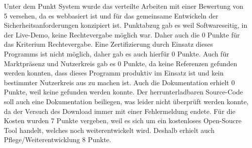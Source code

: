 Unter dem Punkt System wurde das verteilte Arbeiten mit einer Bewertung von  5 versehen, da es webbasiert ist und für das gemeinsame Entwickeln der Sicherheitsanforderungen konzipiert ist. Punktabzug gab es weil Softwareseitig, in der Live-Demo, keine Rechtevergabe möglich war. Daher auch die 0 Punkte für das Kriterium Rechtevergabe. Eine Zertifizierung durch Einsatz dieses Programms ist nicht möglich, daher gab es auch hierfür 0 Punkte. Auch für Marktpräsenz und Nutzerkreis gab es 0 Punkte, da keine Referenzen gefunden werden konnten, dass dieses Programm produktiv im Einsatz ist und kein bestimmter Nutzerkreis aus zu machen ist. Auch die Dokumentation erhielt 0 Punkte, weil keine gefunden werden konnte. Der herrunterladbaren Source-Code soll auch eine Dokumentation beiliegen, was leider nicht überprüft werden konnte, da der Versuch des Download immer mit einer Fehlermeldung endete. Für die Kosten wurden 7 Punkte vergeben, weil es sich um ein kostenloses Open-Soucre Tool handelt, welches noch weiterentwickelt wird. Deshalb erhielt auch Pflege/Weiterentwicklung 8 Punkte.\\
